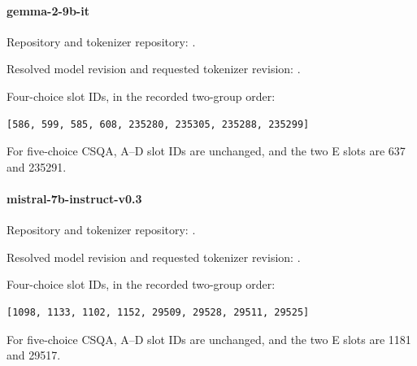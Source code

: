 \noindent\begin{minipage}{\textwidth}
\paragraph{gemma-2-9b-it}

Repository and tokenizer repository: .

\par Resolved model revision and requested tokenizer revision: .

\par Four-choice slot IDs, in the recorded two-group order:

{\small\begin{verbatim}
[586, 599, 585, 608, 235280, 235305, 235288, 235299]
\end{verbatim}}

For five-choice CSQA, A--D slot IDs are unchanged, and the two E slots are 637 and 235291.
\end{minipage}\par\medskip

\noindent\begin{minipage}{\textwidth}
\paragraph{mistral-7b-instruct-v0.3}

Repository and tokenizer repository: .

\par Resolved model revision and requested tokenizer revision: .

\par Four-choice slot IDs, in the recorded two-group order:

{\small\begin{verbatim}
[1098, 1133, 1102, 1152, 29509, 29528, 29511, 29525]
\end{verbatim}}

For five-choice CSQA, A--D slot IDs are unchanged, and the two E slots are 1181 and 29517.
\end{minipage}\par\medskip

